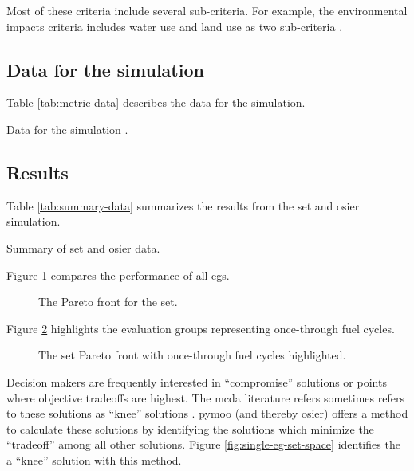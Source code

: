Most of these criteria include several sub-criteria. For example, the environmental impacts criteria 
includes water use and land use as two sub-criteria \cite{wigeland_nuclear_2014-1}.

\subsection{Data for the simulation}

Table \ref{tab:metric-data} describes the data for the simulation.

\begin{sidewaystable}[ht!]
    \centering
    \caption{Data for the simulation \cite{wigeland_nuclear_2014-1}.}
    \label{tab:metric-data}
    \resizebox*{\textwidth}{!}{}
\end{sidewaystable}

\subsection{Results}

Table \ref{tab:summary-data} summarizes the results from the \ac{set} and \ac{osier} simulation.

\begin{table}[ht!]
    \centering
    \caption{Summary of \ac{set} and \ac{osier} data.}
    \label{tab:summary-data}
    \resizebox*{0.75\textwidth}{!}{}
\end{table}


Figure \ref{fig:full-set-space} compares the performance of all \acp{eg}.

\begin{figure}[ht!]
  \centering
  \resizebox{\columnwidth}{!}{}
  \caption{The Pareto front for the \ac{set}.}
  \label{fig:full-set-space}
\end{figure}

Figure \ref{fig:once-through-set-space} highlights the evaluation groups representing once-through
fuel cycles.

\begin{figure}[ht!]
  \centering
  \resizebox{\columnwidth}{!}{}
  \caption{The \ac{set} Pareto front with once-through fuel cycles highlighted.}
  \label{fig:once-through-set-space}
\end{figure}

Decision makers are frequently interested in ``compromise'' solutions or points where objective 
tradeoffs are highest. The \ac{mcda} literature refers sometimes refers to these solutions as ``knee''
solutions \cite{rachmawati_multiobjective_2009}. \ac{pymoo} (and thereby \ac{osier}) offers a method
to calculate these solutions by identifying the solutions which minimize the ``tradeoff'' among all
other solutions. Figure \ref{fig:single-eg-set-space} identifies the a ``knee'' solution with this method.

